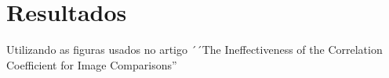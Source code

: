 \documentclass[10pt,a4paper]{article}
\begin{document}

\newpage
\section{Resultados}

Utilizando as figuras usados no artigo ´´The Ineffectiveness of the Correlation
Coefficient for Image Comparisons''

\begin{figure}[h!]
\begin{center}
\hspace{10mm}

\end{center}
\end{figure}
\end{document}
